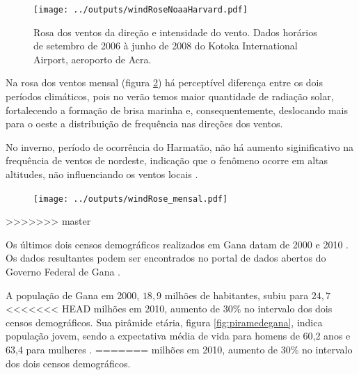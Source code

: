 \begin{figure}[H]
  \centering
  \texttt{[image: ../outputs/windRoseNoaaHarvard.pdf]}
  \caption{Rosa dos ventos da direção e intensidade do vento. 
           Dados horários de setembro de 2006 à junho de 2008 do 
           Kotoka International Airport, aeroporto de Acra. 
           \label{fg:rosaCompleta}}
\end{figure}

Na rosa dos ventos mensal (figura \ref{fig:windRose_mensal})
há perceptível diferença entre os dois períodos climáticos, 
pois no verão temos maior quantidade de radiação solar, fortalecendo a 
formação de brisa marinha e, consequentemente, deslocando mais para o 
oeste a distribuição de frequência nas direções dos ventos.

No inverno, período de ocorrência do Harmatão, não há aumento siginificativo 
na frequência de ventos de nordeste, indicação que o fenômeno ocorre em 
altas altitudes, não influenciando os ventos locais \citep{breuning2005}. 

\begin{figure}[H]
  \centering
  \texttt{[image: ../outputs/windRose\_mensal.pdf]}
  \caption{ \citep{carslaw2012} \label{fig:windRose_mensal}}
\end{figure}


>>>>>>> master

Os últimos dois censos demográficos realizados em Gana datam
de 2000 \citep{ghanacensus2003} e 2010 \citep{ghanacensus2013}. Os
dados resultantes podem ser encontrados no portal de dados abertos
do Governo Federal de Gana \citep{opendataghana}.

A população de Gana em 2000, $18,9$ milhões de habitantes, subiu para $24,7$ 
<<<<<<< HEAD
milhões em 2010, aumento de $30\%$ no intervalo dos dois censos demográficos. 
Sua pirâmide etária, figura \ref{fig:piramedegana}, indica população 
jovem, sendo a expectativa média de vida para homens de 60,2 anos e 
63,4 para mulheres \citep{ghanacensus2013}.
=======
milhões em 2010, aumento de $30\%$ no intervalo dos dois censos demográficos.

